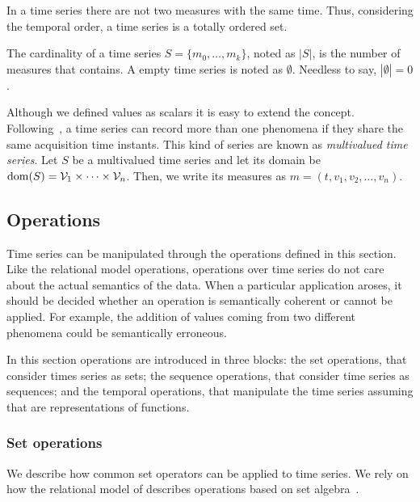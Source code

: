 In a time series there are not two measures with the same time. Thus,
considering the temporal order, a time series is a totally ordered
set.

The cardinality of a time series $S=\{m_0,\dots,m_k\}$, noted as
$|S|$, is the number of measures that contains.  A empty time series is
noted as $\emptyset$. Needless to say, $|\emptyset|=0$.

Although we defined values as scalars it is easy to extend the
concept. Following~\cite{assfalg08:thesis}, a time series can record
more than one phenomena if they share the same acquisition time
instants.  This kind of series are known as \emph{multivalued time
  series}. Let $S$ be a multivalued time series and let its domain be
$\operatorname{dom}(S)={\cal{V}}_1\times\cdots\times{\cal{V}}_n$. Then, we write its measures as $m=(t,v_1,v_2,\ldots,v_n)$.





\subsection{Operations}
\label{sec:model:operations}

Time series can be manipulated through the operations defined in this
section.
%
Like the relational model operations, operations over time series do
not care about the actual semantics of the data. When a particular
application aroses, it should be decided whether an operation is
semantically coherent or cannot be applied. For example, the addition
of values coming from two different phenomena could be semantically
erroneous.

In this section operations are introduced in three blocks: the set
operations, that consider times series as sets; the sequence
operations, that consider time series as sequences; and the temporal
operations, that manipulate the time series assuming that are
representations of functions. 



\subsubsection{Set operations}

We describe how common set operators can be applied to time series. We
rely on how the relational model of  describes operations
based on set algebra~\cite{date:introduction}.

